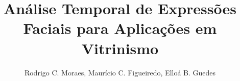 \documentclass[12pt]{article}
\title{Análise Temporal de Expressões Faciais para Aplicações em Vitrinismo}
\author{Rodrigo C. Moraes, Maurício C. Figueiredo, Elloá B. Guedes \email{\{rcm, cfigueiredo, ebgcosta\}.eng@uea.edu.br}
}
\begin{document}
 

\maketitle







\cite{*}


\end{document}
